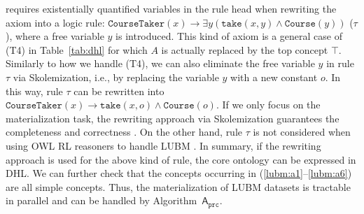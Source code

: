 requires existentially quantified variables in the rule head when rewriting
the axiom into a logic rule: $\texttt{CourseTaker}(x)\rightarrow\exists y(\texttt{take}(x,y)\wedge \texttt{Course}(y))$ ($\tau$),
where a free variable $y$ is introduced. This kind of axiom is a general case of (T4) in Table~\ref{tab:dhl}
for which $A$ is actually replaced by the top concept $\top$.
Similarly to how we handle (T4), we can also eliminate the free variable $y$
in rule $\tau$ via Skolemization, i.e., by replacing the variable $y$ with a new constant $o$.
In this way, rule $\tau$ can be rewritten into $\texttt{CourseTaker}(x)\rightarrow\texttt{take}(x,o)\wedge \texttt{Course}(o)$.
If we only focus on the materialization task, the rewriting approach via Skolemization guarantees the
completeness and correctness \cite{GrauHKKMMW13}.
On the other hand, rule $\tau$ is not considered when using OWL RL reasoners to handle LUBM \cite{UrbaniKMHB12,WeaverH09}.
In summary, if the rewriting approach is used for the above kind of rule,
the core ontology can be expressed in DHL.
We can further check that the concepts occurring in (\ref{lubm:a1}--\ref{lubm:a6})
are all simple concepts. Thus,
the materialization of LUBM datasets is tractable in parallel and can be handled by
Algorithm~$\mathsf{A}_{\texttt{prc}}$.


